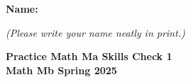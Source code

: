\documentclass{article}
\begin{document}
 

 \noindent
{\large \mbox{} \hfill \bf Name:\underline{\hspace{3in}}}

 {\mbox{} \hfill \it (Please write your name neatly in print.)}


 
\medskip
 
\noindent
{\large\bf
Practice Math Ma Skills Check 1 \\ Math Mb Spring 2025}
\noindent

\end{document}
